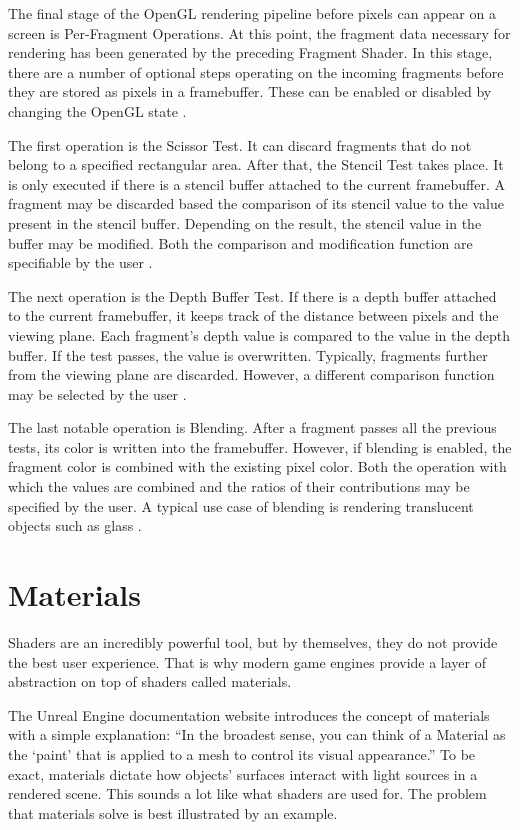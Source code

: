\documentclass[
  digital,     %
  oneside,     %
  nosansbold,  %
  nocolorbold, %
  lof,         %
  lot,         %
]{fithesis4}
\begin{document}
The final stage of the OpenGL rendering pipeline before pixels can appear on a screen is Per-Fragment Operations.
At this point, the fragment data necessary for
rendering has been generated by the preceding Fragment Shader. In this stage, there are a number
of optional steps operating on the incoming fragments before they are stored as pixels in a framebuffer.
These can be enabled or disabled by changing the OpenGL state \cite[p.46]{opengl-superbible}.

The first operation is the Scissor Test. It can discard fragments that do not belong to a specified rectangular area.
After that, the Stencil Test takes place. It is only executed if there is a stencil buffer attached to
the current framebuffer. A fragment may be discarded based the comparison of its stencil value
to the value present in the stencil buffer. Depending on the result, the stencil value in the buffer
may be modified. Both the comparison and modification function are specifiable by the user
\cite[p.504-506]{opengl-book}.

The next operation is the Depth Buffer Test. If there is a depth buffer attached to the current framebuffer,
it keeps track of the distance between pixels and the viewing plane. Each fragment's depth value
is compared to the value in the depth buffer. If the test passes, the value is overwritten.
Typically, fragments further from the viewing plane are discarded. However,
a different comparison function may be selected by the user \cite[p.510]{opengl-book}.

The last notable operation is Blending. After a fragment passes all the previous tests,
its color is written into the framebuffer. However, if blending is enabled,
the fragment color is combined with the existing pixel color.
Both the operation with which the values are combined and the ratios of their contributions
may be specified by the user. A typical use case of blending is rendering translucent objects such as glass \cite[p.251-256]{opengl-book}.

\chapter{Materials}
Shaders are an incredibly powerful tool, but by themselves, they do not provide the best user experience.
That is why modern game engines provide a layer of abstraction on top of shaders called materials.

The Unreal Engine documentation website \cite{ue-materials} introduces the concept of materials with
a simple explanation: \enquote{In the broadest sense, you can think of a Material as the \enquote{paint} that is applied to a mesh
to control its visual appearance.} To be exact, materials dictate how objects' surfaces interact with light sources
in a rendered scene. This sounds a lot like what shaders are used for. The problem that materials solve is best illustrated
by an example.
\end{document}
